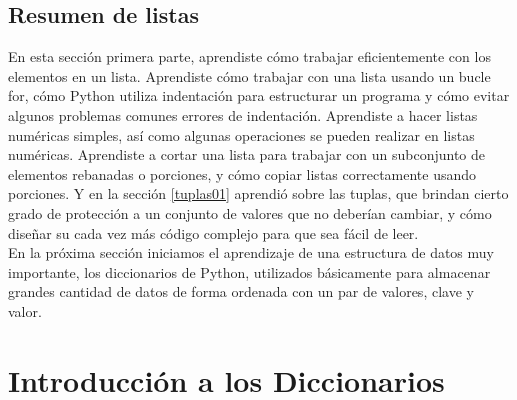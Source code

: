 

\subsection{Resumen de listas}

En esta sección primera parte, aprendiste cómo trabajar eficientemente con los elementos en un
lista. Aprendiste cómo trabajar con una lista usando un bucle   {\ttfamily for}, cómo Python
utiliza indentación  para estructurar un programa y cómo evitar algunos problemas comunes
errores de indentación. Aprendiste a hacer listas numéricas simples, así como algunas  operaciones se pueden realizar en listas numéricas. Aprendiste a cortar una lista para trabajar con un subconjunto de elementos rebanadas o porciones, y cómo copiar listas correctamente usando porciones. Y en la sección \ref{tuplas01} aprendió sobre las tuplas, que brindan cierto grado de protección a un conjunto de valores que no deberían cambiar, y cómo diseñar su cada vez más código complejo para que sea fácil de leer.\\


En la próxima sección  iniciamos el aprendizaje de una estructura de datos muy importante, los diccionarios de Python, utilizados básicamente para almacenar grandes cantidad de datos de forma ordenada con un par de valores, clave y valor. 



\section{Introducción a los Diccionarios}\label{diccionario}\hypertarget{diccionario}{}


